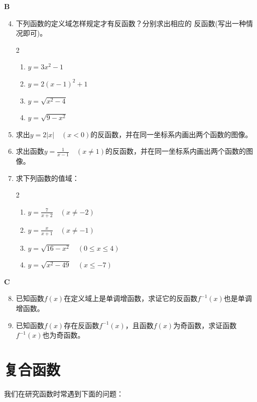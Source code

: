 \begin{center}
    \bfseries B
\end{center}
\begin{enumerate}\setcounter{enumi}{3}
    \item 下列函数的定义域怎样规定才有反函数？分别求出相应的
反函数(写出一种情况即可)。
\begin{multicols}{2}
\begin{enumerate}[(1)]
    \item $y= 3x^2- 1$ 
    \item $y= 2( x- 1) ^2+ 1 $
    \item $y= \sqrt{x^{2}- 4}$
    \item $y= \sqrt{9- x^{2}}$
\end{enumerate}
\end{multicols}
\item 求出$y=2|x|\quad (x<0)$的反函数，并在同一坐标系内画出两个函数的图像。
\item 求出函数$y=\frac{1}{x-1}\quad (x\ne 1)$的反函数，并在同一坐标系内画出两个函数的图像。
\item 求下列函数的值域：
\begin{multicols}{2}
\begin{enumerate}[(1)]
    \item $y=\frac{7}{x+2}\quad ( x\ne -2)$
    \item $y=\frac{x}{x+1}\quad (x\ne -1)$
    \item $y=\sqrt{16-x^2}\quad (0\le x\le 4)$
    \item $y=\sqrt{x^2-49}\quad (x\le -7)$
\end{enumerate}    
\end{multicols}
\end{enumerate}

\begin{center}
    \bfseries C
\end{center}

\begin{enumerate}\setcounter{enumi}{7}
    \item 已知函数$f(x)$在定义域上是单调增函数，求证它的反函数$f^{-1}(x)$也是单调增函数。
  \item   已知函数$f(x)$存在反函数$f^{-1}(x)$，且函数$f(x)$为奇函数，求证函数$f^{-1}(x)$也为奇函数。
\end{enumerate}

\section{复合函数}
我们在研究函数时常遇到下面的问题：

